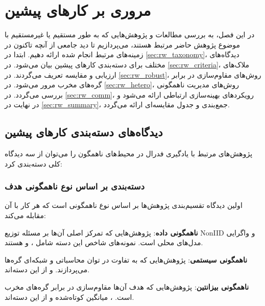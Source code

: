 \chapter{مروری بر کارهای پیشین}
\label{chap:relatedworks}

در این فصل، به بررسی مطالعات و پژوهش‌هایی که به طور مستقیم یا غیرمستقیم با موضوع پژوهش حاضر مرتبط هستند، می‌پردازیم تا دید جامعی از آنچه تاکنون در زمینه‌های مرتبط انجام شده ارائه دهیم. ابتدا در \autoref{sec:rw_taxonomy}، دیدگاه‌های مختلف برای دسته‌بندی کارهای پیشین بیان می‌شود. در \autoref{sec:rw_criteria}، ملاک‌های ارزیابی و مقایسه تعریف می‌گردند. در \autoref{sec:rw_robust}، روش‌های مقاوم‌سازی در برابر گره‌های مخرب مرور می‌شود. در \autoref{sec:rw_hetero}، روش‌های مدیریت ناهمگونی بررسی می‌گردد. در \autoref{sec:rw_comm}، رویکردهای بهینه‌سازی ارتباطی ارائه می‌شود و در نهایت در \autoref{sec:rw_summary}، جمع‌بندی و جدول مقایسه‌ای ارائه می‌گردد.


\section{دیدگاه‌های دسته‌بندی کارهای پیشین}
\label{sec:rw_taxonomy}

پژوهش‌های مرتبط با یادگیری فدرال در محیط‌های ناهمگون را می‌توان از سه دیدگاه کلی دسته‌بندی کرد:

\subsection{دسته‌بندی بر اساس نوع ناهمگونی هدف}

اولین دیدگاه تقسیم‌بندی پژوهش‌ها بر اساس نوع ناهمگونی است که هر کار با آن مقابله می‌کند:

\begin{itemize}
    \tick \textbf{ناهمگونی داده}: پژوهش‌هایی که تمرکز اصلی آن‌ها بر مسئله توزیع \gls{NonIID} و واگرایی مدل‌های محلی است. نمونه‌های شاخص این دسته شامل  \cite{li2020federated}،  \cite{karimireddy2020scaffold} و  \cite{li2021model} هستند.
    
    \tick \textbf{ناهمگونی سیستمی}: پژوهش‌هایی که به تفاوت در توان محاسباتی و شبکه‌ای گره‌ها می‌پردازند.  و  \cite{xie2019asynchronous} از این دسته‌اند.
    
    \tick \textbf{ناهمگونی بیزانتین}: پژوهش‌هایی که هدف آن‌ها مقاوم‌سازی در برابر گره‌های مخرب است.  \cite{blanchard2017machine}، میانگین کوتاه‌شده \cite{yin2018byzantine} و  \cite{el2018byzantine} از این دسته‌اند.
\end{itemize}

